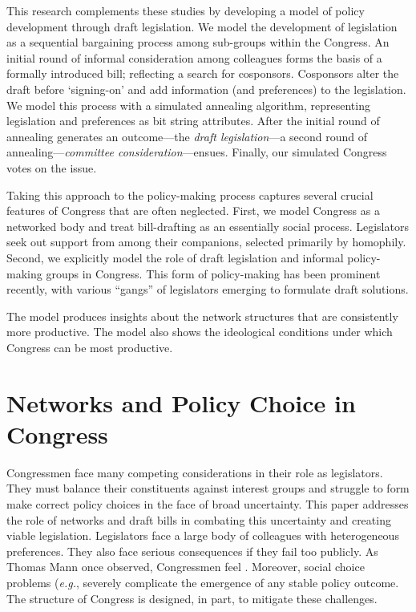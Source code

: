 \documentclass[pdftex,12pt]{llncs}
\begin{document}
This research complements these studies by developing a model of policy development through draft legislation. 
We model the development of legislation as a sequential bargaining process among sub-groups within the Congress. 
An initial round of informal consideration among colleagues forms the basis of a formally introduced bill; reflecting a search for cosponsors. 
Cosponsors alter the draft before `signing-on' and add information (and preferences) to the legislation. 
We model this process with a simulated annealing algorithm, representing legislation and preferences as bit string attributes. 
After the initial round of annealing generates an outcome---the \textit{draft legislation}---a second round of annealing---\textit{committee consideration}---ensues. 
Finally, our simulated Congress votes on the issue.

Taking this approach to the policy-making process captures several crucial features of Congress that are often neglected. 
First, we model Congress as a networked body and treat bill-drafting as an essentially social process. 
Legislators seek out support from among their companions, selected primarily by homophily. 
Second, we explicitly model the role of draft legislation and informal policy-making groups in Congress. 
This form of policy-making has been prominent recently, with various ``gangs'' of legislators emerging to formulate draft solutions.

The model produces insights about the network structures that are consistently more productive. The model also shows the ideological conditions under which Congress can be most productive. 
        

\section{Networks and Policy Choice in Congress}

Congressmen face many competing considerations in their role as legislators. 
They must balance their constituents against interest groups and struggle to form make correct policy choices in the face of broad uncertainty. 
This paper addresses the role of networks and draft bills in combating this uncertainty and creating viable legislation.
Legislators face a large body of colleagues with heterogeneous preferences. 
They also face serious consequences if they fail too publicly. 
As Thomas Mann once observed, Congressmen feel  \parencite{m78}. 
Moreover, social choice problems (\textit{e.g.}, \cite{sw87} severely complicate the emergence of any stable policy outcome. 
The structure of Congress is designed, in part, to mitigate these challenges\parencite{sw87}. 
\end{document}
